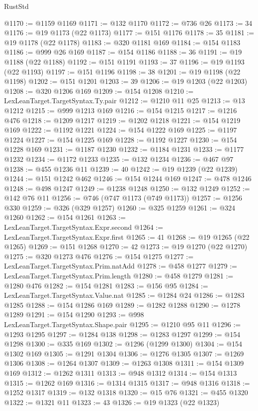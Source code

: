 \begin{lexlean}{RustStd}
\begin{coremodule}
@1170 := @1159 @1169
@1171 := @132 @1170
@1172 := @736 @26
@1173 := 34
@1176 := @19 @1173 (@22 @1173)
@1177 := @151 @1176
@1178 := 35
@1181 := @19 @1178 (@22 @1178)
@1183 := @320 @1181 @169
@1184 := @154 @1183
@1186 := @999 @26 @169
@1187 := @154 @1186
@1188 := 36
@1191 := @19 @1188 (@22 @1188)
@1192 := @151 @1191
@1193 := 37
@1196 := @19 @1193 (@22 @1193)
@1197 := @151 @1196
@1198 := 38
@1201 := @19 @1198 (@22 @1198)
@1202 := @151 @1201
@1203 := 39
@1206 := @19 @1203 (@22 @1203)
@1208 := @320 @1206 @169
@1209 := @154 @1208
@1210 := LexLeanTarget.TargetSyntax.Ty.pair
@1212 := @1210 @11 @25
@1213 := @13 @1212
@1215 := @999 @1213 @169
@1216 := @154 @1215
@1217 := @1216 @476
@1218 := @1209 @1217
@1219 := @1202 @1218
@1221 := @154 @1219 @169
@1222 := @1192 @1221
@1224 := @154 @1222 @169
@1225 := @1197 @1224
@1227 := @154 @1225 @169
@1228 := @1192 @1227
@1230 := @154 @1228 @169
@1231 := @1187 @1230
@1232 := @1184 @1231
@1233 := @1177 @1232
@1234 := @1172 @1233
@1235 := @132 @1234
@1236 := @467 @97
@1238 := @455 @1236 @11
@1239 := 40
@1242 := @19 @1239 (@22 @1239)
@1244 := @151 @1242 @462
@1246 := @154 @1244 @169
@1247 := @478 @1246
@1248 := @498 @1247
@1249 := @1238 @1248
@1250 := @132 @1249
@1252 := @142 @76 @11
@1256 := @746 (@747 @1173 (@749 @1173))
@1257 := @1256 @330
@1259 := @326 (@329 @1257)
@1260 := @325 @1259
@1261 := @324 @1260
@1262 := @154 @1261
@1263 := LexLeanTarget.TargetSyntax.Expr.second
@1264 := LexLeanTarget.TargetSyntax.Expr.first
@1265 := 41
@1268 := @19 @1265 (@22 @1265)
@1269 := @151 @1268
@1270 := 42
@1273 := @19 @1270 (@22 @1270)
@1275 := @320 @1273 @476
@1276 := @154 @1275
@1277 := LexLeanTarget.TargetSyntax.Prim.natAdd
@1278 := @458 @1277
@1279 := LexLeanTarget.TargetSyntax.Prim.length
@1280 := @458 @1279
@1281 := @1280 @476
@1282 := @154 @1281
@1283 := @156 @95
@1284 := LexLeanTarget.TargetSyntax.Value.nat
@1285 := @1284 @24
@1286 := @1283 @1285
@1288 := @154 @1286 @169
@1289 := @1282 @1288
@1290 := @1278 @1289
@1291 := @154 @1290
@1293 := @998 LexLeanTarget.TargetSyntax.Shape.pair
@1295 := @1210 @95 @11
@1296 := @1293 @1295
@1297 := @1284 @138
@1298 := @1283 @1297
@1299 := @154 @1298
@1300 := @335 @169
@1302 := @1296 (@1299 @1300)
@1304 := @154 @1302 @169
@1305 := @1291 @1304
@1306 := @1276 @1305
@1307 := @1269 @1306
@1308 := @1264 @1307
@1309 := @1263 @1308
@1311 := @154 @1309 @169
@1312 := @1262 @1311
@1313 := @948 @1312
@1314 := @154 @1313
@1315 := @1262 @169
@1316 := @1314 @1315
@1317 := @948 @1316
@1318 := @1252 @1317
@1319 := @132 @1318
@1320 := @15 @76
@1321 := @455 @1320
@1322 := @1321 @11
@1323 := 43
@1326 := @19 @1323 (@22 @1323)

\end{coremodule}
\end{lexlean}

